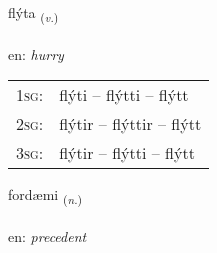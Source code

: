\documentclass[frontgrid, backgrid]{flacards}\usepackage[]{graphicx}\usepackage[]{xcolor}
\begin{document}
\renewcommand{\flhead}{\vskip5pt \fboxsep=0pt {\small\bfseries\footnotesize Sagnorð | Verb}}
\renewcommand{\fcfoot}{\vskip5pt \fboxsep=0pt \hspace{2pt}{\small\bfseries\footnotesize 3K}}

\renewcommand{\blhead}{\vskip5pt {\small\bfseries\footnotesize Sagnorð | Verb }}
\renewcommand{\bcfoot}{\vskip5pt \hspace{2pt}{\small\bfseries\footnotesize 3K}}


{flýta \small{\textsubscript{(\textit{v.})}} \\[1ex] %
\textphonetic{[fliːta]} \\
en: \emph{hurry} \\  [2ex]
\renewcommand*{\arraystretch}{0.8}
\begin{tabular}{p{1cm}l}
\textsc{1sg}: & flýti -- flýtti -- flýtt \\ 
\textsc{2sg}: & flýtir -- flýttir -- flýtt \\ 
\textsc{3sg}: & flýtir -- flýtti -- flýtt \\ 
\end{tabular}
}

\renewcommand{\flhead}{\vskip5pt \fboxsep=0pt {\small\bfseries\footnotesize Nafnorð | Noun}}
\renewcommand{\fcfoot}{\vskip5pt \fboxsep=0pt \hspace{2pt}{\small\bfseries\footnotesize 3K}}

\renewcommand{\blhead}{\vskip5pt {\small\bfseries\footnotesize Nafnorð | Noun }}
\renewcommand{\bcfoot}{\vskip5pt \hspace{2pt}{\small\bfseries\footnotesize 3K}}


{fordæmi \small{\textsubscript{(\textit{n.})}} \\[1ex] %
\textphonetic{[fɔrtaimɪ]} \\
en: \emph{precedent} \\  [2ex]
\renewcommand*{\arraystretch}{0.8}
}
\end{document}
